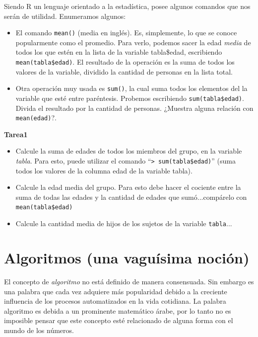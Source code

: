 \documentclass[11pt,a4paper]{article}
\begin{document}
Siendo R un lenguaje orientado a la estadística, posee algunos comandos que nos serán de utilidad. Enumeramos algunos:
\begin{itemize}

\item[$\bullet$] El comando \texttt{mean()} (media en inglés). Es, simplemente, lo que se conoce popularmente como el promedio. Para verlo, podemos sacer la edad \textit{media} de todos los que estén en la lista de la variable tabla\$edad, escribiendo \texttt{mean(tabla\$edad)}. El resultado de la operación es la suma de todos los valores de la variable, dividido la cantidad de personas en la lista total.

\item[$\bullet$] Otra operación muy usada es \texttt{sum()}, la cual suma todos los elementos del la variable que esté entre paréntesis. Probemos escribiendo \texttt{sum(tabla\$edad)}. Divida el resultado por la cantidad de personas. ¿Muestra alguna relación con \texttt{mean(edad)}?.


\end{itemize}

\textbf{Tarea1}

\begin{itemize}

\item[1.a] Calcule la suma de edades de todos los miembros del grupo, en la variable \textit{tabla}. Para esto, puede utilizar el comando ``\texttt{> sum(tabla\$edad)}'' (suma todos los valores de la columna edad de la variable tabla).

\item[1.b] Calcule la edad media del grupo. Para esto debe hacer el cociente entre la suma de todas las edades y la cantidad de edades que sumó...compárelo con \texttt{mean(tabla\$edad)}

\item[1.c] Calcule la cantidad media de hijos de los sujetos de la variable \texttt{tabla}...

\end{itemize}


\section{Algoritmos (una vaguísima noción)}

El concepto de \textit{algoritmo} no está definido de manera consensuada. Sin embargo es una palabra que cada vez adquiere más popularidad debido a la creciente influencia de los procesos automatizados en la vida cotidiana. La palabra algoritmo es debida a un prominente matemático árabe, por lo tanto no es imposible pensar que este concepto esté relacionado de alguna forma con el mundo de los números.
\end{document}
